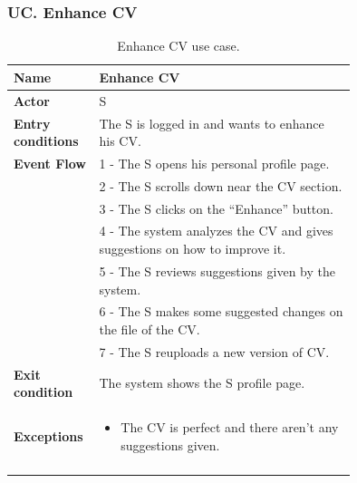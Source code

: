 \subsubsection*{UC\cuc . Enhance CV}
\begin{center}
    \begin{longtable}{|l|p{0.75\linewidth}|}
        \hline
        \textbf{Name}               & Enhance CV\\
        \hline
        \textbf{Actor}              & S\\
        \hline
        \textbf{Entry conditions}   & The S is logged in and wants to enhance his CV.\\
        \hline
        \textbf{Event Flow}         & 1 - The S opens his personal profile page. \\
        & 2 - The S scrolls down near the CV section. \\
        & 3 - The S clicks on the “Enhance” button. \\
        & 4 - The system analyzes the CV and gives suggestions on how to improve it. \\
        & 5 - The S reviews suggestions given by the system. \\
        & 6 - The S makes some suggested changes on the file of the CV. \\
        & 7 - The S reuploads a new version of CV. \\
        \hline
        \textbf{Exit condition}   & The system shows the S profile page. \\       
        \hline
        \textbf{Exceptions}       & \begin{itemize}
            \item The CV is perfect and there aren’t any suggestions given.
        \end{itemize}\\
        \hline
        \caption{Enhance CV use case.}
        \label{tab: enhance_cv_use_case}
    \end{longtable}
\end{center}
 

